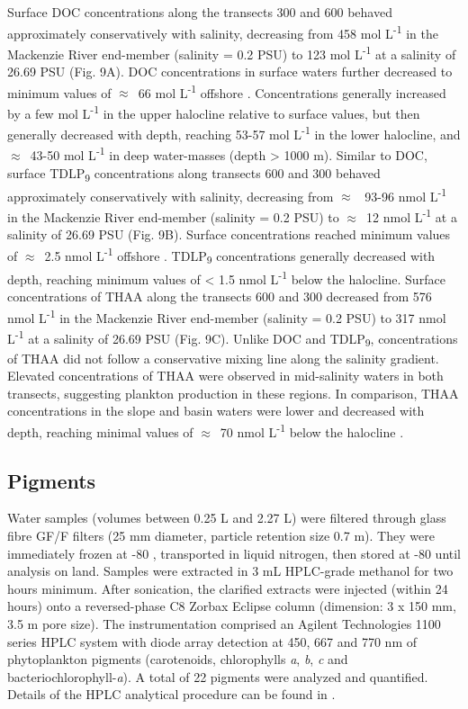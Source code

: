 \documentclass[essd, manuscript]{copernicus}
\begin{document}
Surface DOC concentrations along the transects 300 and 600 behaved approximately conservatively with salinity, decreasing from 458 \textmu mol L\textsuperscript{-1} in the Mackenzie River end-member (salinity = 0.2 PSU) to 123 \textmu mol L\textsuperscript{-1} at a salinity of 26.69 PSU (Fig. 9A). DOC concentrations in surface waters further decreased to minimum values of $\approx$~66 \textmu mol L\textsuperscript{-1} offshore \citep{Fichot2011}. Concentrations generally increased by a few \textmu mol L\textsuperscript{-1} in the upper halocline relative to surface values, but then generally decreased with depth, reaching 53-57 \textmu mol L\textsuperscript{-1} in the lower halocline, and $\approx$~43-50 \textmu mol L\textsuperscript{-1} in deep water-masses (depth > 1000 m). Similar to DOC, surface TDLP\textsubscript{9} concentrations along transects 600 and 300 behaved approximately conservatively with salinity, decreasing from $\approx$~ 93-96 nmol L\textsuperscript{-1} in the Mackenzie River end-member (salinity = 0.2 PSU) to $\approx$~12 nmol L\textsuperscript{-1} at a salinity of 26.69 PSU (Fig. 9B). Surface concentrations reached minimum values of $\approx$~2.5 nmol L\textsuperscript{-1} offshore \citep{Fichot2016}. TDLP\textsubscript{9} concentrations generally decreased with depth, reaching minimum values of < 1.5 nmol L\textsuperscript{-1} below the halocline. Surface concentrations of THAA along the transects 600 and 300 decreased from 576 nmol L\textsuperscript{-1} in the Mackenzie River end-member (salinity = 0.2 PSU) to 317 nmol L\textsuperscript{-1} at a salinity of 26.69 PSU (Fig. 9C). Unlike DOC and TDLP\textsubscript{9}, concentrations of THAA did not follow a conservative mixing line along the salinity gradient. Elevated concentrations of THAA were observed in mid-salinity waters in both transects, suggesting plankton production in these regions. In comparison, THAA concentrations in the slope and basin waters were lower and decreased with depth, reaching minimal values of $\approx$~70 nmol L\textsuperscript{-1} below the halocline \citep{Shen2012}.

\subsection{Pigments}

Water samples (volumes between 0.25 L and 2.27 L) were filtered through glass fibre GF/F filters (25 mm diameter, particle retention size 0.7 \textmu m). They were immediately frozen at -80 \textcelsius{}, transported in liquid nitrogen, then stored at -80 \textcelsius{} until analysis on land. Samples were extracted in 3 mL HPLC-grade methanol for two hours minimum. After sonication, the clarified extracts were injected (within 24 hours) onto a reversed-phase C8 Zorbax Eclipse column (dimension: 3 x 150 mm, 3.5 \textmu m pore size). The instrumentation comprised an Agilent Technologies 1100 series HPLC system with diode array detection at 450, 667 and 770 nm of phytoplankton pigments (carotenoids, chlorophylls \textit{a}, \textit{b}, \textit{c} and bacteriochlorophyll-\textit{a}). A total of 22 pigments were analyzed and quantified. Details of the HPLC analytical procedure can be found in \citet{Ras2008}.
\end{document}
